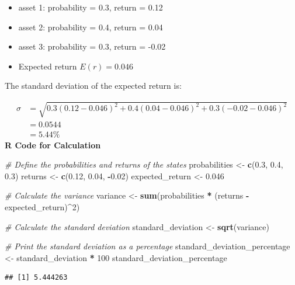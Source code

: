\documentclass[
]{book}
\newenvironment{Shaded}{\begin{snugshade}}{\end{snugshade}}
\newcommand{\CommentTok}[1]{\textcolor[rgb]{0.56,0.35,0.01}{\textit{#1}}}
\newcommand{\DecValTok}[1]{\textcolor[rgb]{0.00,0.00,0.81}{#1}}
\newcommand{\FloatTok}[1]{\textcolor[rgb]{0.00,0.00,0.81}{#1}}
\newcommand{\FunctionTok}[1]{\textcolor[rgb]{0.13,0.29,0.53}{\textbf{#1}}}
\newcommand{\NormalTok}[1]{#1}
\newcommand{\OtherTok}[1]{\textcolor[rgb]{0.56,0.35,0.01}{#1}}
\newcommand{\SpecialCharTok}[1]{\textcolor[rgb]{0.81,0.36,0.00}{\textbf{#1}}}
\providecommand{\tightlist}{%
  \setlength{\itemsep}{0pt}\setlength{\parskip}{0pt}}
\begin{document}
\begin{itemize}
\tightlist
\item
  asset 1: probability = 0.3, return = 0.12
\item
  asset 2: probability = 0.4, return = 0.04
\item
  asset 3: probability = 0.3, return = -0.02
\item
  Expected return \(E(r) = 0.046\)
\end{itemize}

The standard deviation of the expected return is:

\[
\begin{aligned}
\sigma &= \sqrt{0.3(0.12 - 0.046)^2 + 0.4(0.04 - 0.046)^2 + 0.3(-0.02 - 0.046)^2}\\
       &= 0.0544\\
       &= 5.44\%
\end{aligned}
\]
\textbf{R Code for Calculation}

\begin{Shaded}
\begin{Highlighting}[]
\CommentTok{\# Define the probabilities and returns of the states}
\NormalTok{probabilities }\OtherTok{\textless{}{-}} \FunctionTok{c}\NormalTok{(}\FloatTok{0.3}\NormalTok{, }\FloatTok{0.4}\NormalTok{, }\FloatTok{0.3}\NormalTok{)}
\NormalTok{returns }\OtherTok{\textless{}{-}} \FunctionTok{c}\NormalTok{(}\FloatTok{0.12}\NormalTok{, }\FloatTok{0.04}\NormalTok{, }\SpecialCharTok{{-}}\FloatTok{0.02}\NormalTok{)}
\NormalTok{expected\_return }\OtherTok{\textless{}{-}} \FloatTok{0.046}

\CommentTok{\# Calculate the variance}
\NormalTok{variance }\OtherTok{\textless{}{-}} \FunctionTok{sum}\NormalTok{(probabilities }\SpecialCharTok{*}\NormalTok{ (returns }\SpecialCharTok{{-}}\NormalTok{ expected\_return)}\SpecialCharTok{\^{}}\DecValTok{2}\NormalTok{)}

\CommentTok{\# Calculate the standard deviation}
\NormalTok{standard\_deviation }\OtherTok{\textless{}{-}} \FunctionTok{sqrt}\NormalTok{(variance)}

\CommentTok{\# Print the standard deviation as a percentage}
\NormalTok{standard\_deviation\_percentage }\OtherTok{\textless{}{-}}\NormalTok{ standard\_deviation }\SpecialCharTok{*} \DecValTok{100}
\NormalTok{standard\_deviation\_percentage}
\end{Highlighting}
\end{Shaded}

\begin{verbatim}
## [1] 5.444263
\end{verbatim}
\end{document}
